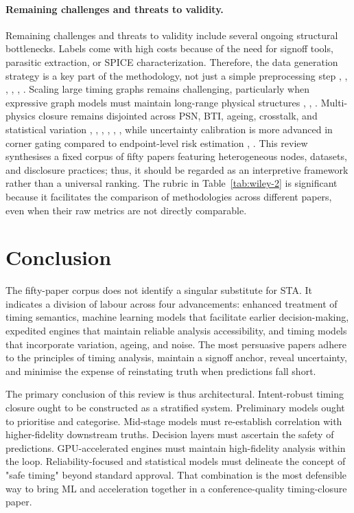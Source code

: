 \documentclass[num-refs]{wiley-article}
\begin{document}
  \paragraph{Remaining challenges and threats to validity.} Remaining challenges and threats to validity include several ongoing structural bottlenecks. Labels come with high costs because of the need for signoff tools, parasitic extraction, or SPICE characterization. Therefore, the data generation strategy is a key part of the methodology, not just a simple preprocessing step \cite{ref4}, \cite{ref6}, \cite{ref8}, \cite{ref10}, \cite{ref13}, \cite{ref25}. Scaling large timing graphs remains challenging, particularly when expressive graph models must maintain long-range physical structures \cite{ref5}, \cite{ref17}, \cite{ref43}. Multi-physics closure remains disjointed across PSN, BTI, ageing, crosstalk, and statistical variation \cite{ref12}, \cite{ref14}, \cite{ref15}, \cite{ref44}, \cite{ref48}, \cite{ref49}, while uncertainty calibration is more advanced in corner gating compared to endpoint-level risk estimation \cite{ref16}, \cite{ref9}. This review synthesises a fixed corpus of fifty papers featuring heterogeneous nodes, datasets, and disclosure practices; thus, it should be regarded as an interpretive framework rather than a universal ranking. The rubric in Table~\ref{tab:wiley-2} is significant because it facilitates the comparison of methodologies across different papers, even when their raw metrics are not directly comparable.


  \section{Conclusion}

  The fifty-paper corpus does not identify a singular substitute for STA. It indicates a division of labour across four advancements: enhanced treatment of timing semantics, machine learning models that facilitate earlier decision-making, expedited engines that maintain reliable analysis accessibility, and timing models that incorporate variation, ageing, and noise. The most persuasive papers adhere to the principles of timing analysis, maintain a signoff anchor, reveal uncertainty, and minimise the expense of reinstating truth when predictions fall short.


  The primary conclusion of this review is thus architectural. Intent-robust timing closure ought to be constructed as a stratified system. Preliminary models ought to prioritise and categorise. Mid-stage models must re-establish correlation with higher-fidelity downstream truths. Decision layers must ascertain the safety of predictions. GPU-accelerated engines must maintain high-fidelity analysis within the loop. Reliability-focused and statistical models must delineate the concept of "safe timing" beyond standard approval. That combination is the most defensible way to bring ML and acceleration together in a conference-quality timing-closure paper.
\end{document}
